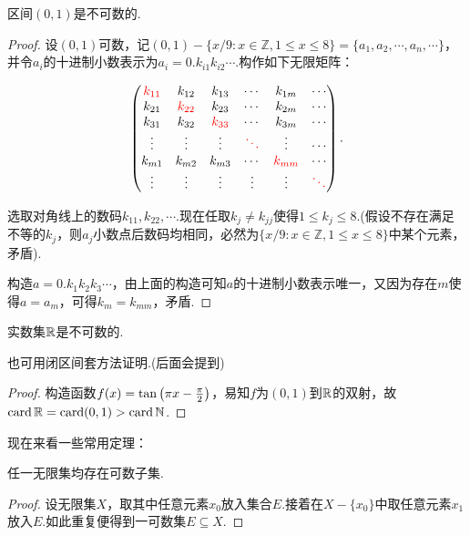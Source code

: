 \begin{proposition}
	区间$(0,1)$是不可数的.
\end{proposition}
\begin{proof}
	设$(0,1)$可数，记$(0,1)-\{ x/9:x \in \mathbb{Z}, 1 \leq x \leq 8 \}=\{ a_1, a_2, \cdots ,a_n ,\cdots \}$，并令$a_i$的十进制小数表示为$a_i=0.k_{i1}k_{i2}\cdots$.构作如下无限矩阵：
	
	$$\begin{pmatrix}
 \color{red} k_{11} & k_{12} & k_{13} & \cdots & k_{1m} & \cdots \\
 k_{21} & \color{red} k_{22} & k_{23} & \cdots & k_{2m} & \cdots \\
 k_{31} & k_{32} & \color{red} k_{33} & \cdots & k_{3m} & \cdots \\
 \vdots & \vdots & \vdots & \color{red} \ddots & \vdots & \cdots \\
 k_{m1} & k_{m2} & k_{m3} & \cdots & \color{red} k_{mm} & \cdots \\
 \vdots & \vdots & \vdots & \vdots & \vdots & \color{red} \ddots
\end{pmatrix}.$$

	选取对角线上的数码$k_{11},k_{22},\cdots $.现在任取$k_j \neq k_{jj}$使得$1 \leq k_j \leq 8$.(假设不存在满足不等的$k_j$，则$a_j$小数点后数码均相同，必然为$\{ x/9:x \in \mathbb{Z}, 1 \leq x \leq 8 \}$中某个元素，矛盾).
	
	构造$a=0.k_1k_2k_3\cdots$，由上面的构造可知$a$的十进制小数表示唯一，又因为存在$m$使得$a=a_m$，可得$k_m=k_{mm}$，矛盾.
\end{proof}

\begin{corollary}
	实数集$\mathbb{R}$是不可数的.
\end{corollary}
\begin{remark}
	也可用闭区间套方法证明.(后面会提到)
\end{remark}
\begin{proof}
	构造函数$f(x)=\tan \left( \pi x-\frac{\pi}{2} \right)$，易知$f$为$(0,1)$到$\mathbb{R}$的双射，故$\operatorname{card} \mathbb{R} = \operatorname{card} (0,1) > \operatorname{card} \mathbb{N}$.
\end{proof}

现在来看一些常用定理：

\begin{lemma}
	任一无限集均存在可数子集.
\end{lemma}
\begin{proof}
	设无限集$X$，取其中任意元素$x_0$放入集合$E$.接着在$X-\{ x_0 \}$中取任意元素$x_1$放入$E$.如此重复便得到一可数集$E \subseteq X$.
\end{proof}


